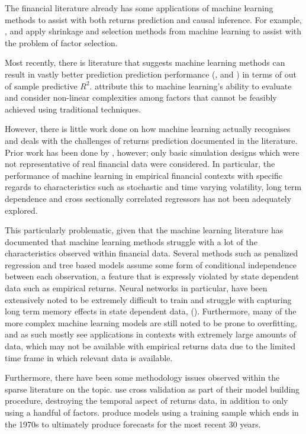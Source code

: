 \documentclass[11pt, a4paper, table]{article}
\begin{document}
The financial literature already has some applications of machine learning methods to assist with both returns prediction and causal inference. For example, \cite{kozak_shrinking_2017}, \cite{rapach_forecasting_2013} and \cite{freyberger_dissecting_2017} apply shrinkage and selection methods from machine learning to assist with the problem of factor selection.

Most recently, there is literature that suggests machine learning methods can result in vastly better prediction prediction performance (\cite{gu_empirical_2018}, \cite{hsu_finding_2014} and \cite{feng_deep_2018}) in terms of out of sample predictive $R^2$. \cite{gu_empirical_2018} attribute this to machine learning's ability to evaluate and consider non-linear complexities among factors that cannot be feasibly achieved using traditional techniques. 

However, there is little work done on how machine learning actually recognises and deals with the challenges of returns prediction documented in the literature. Prior work has been done by \cite{gu_empirical_2018}, however; only basic simulation designs which were not representative of real financial data were considered. In particular, the performance of machine learning in empirical financial contexts with specific regards to characteristics such as stochastic and time varying volatility, long term dependence and cross sectionally correlated regressors has not been adequately explored. 

This particularly problematic, given that the machine learning literature has documented that machine learning methods struggle with a lot of the characteristics observed within financial data. Several methods such as penalized regression and tree based models assume some form of conditional independence between each observation, a feature that is expressly violated by state dependent data such as empirical returns. Neural networks in particular, have been extensively noted to be extremely difficult to train and struggle with capturing long term memory effects in state dependent data, (\cite{bengio_learning_1994}). Furthermore, many of the more complex machine learning models are still noted to be prone to overfitting, and as such mostly see applications in contexts with extremely large amounts of data, which may not be available with empirical returns data due to the limited time frame in which relevant data is available. 

Furthermore, there have been some methodology issues observed within the sparse literature on the topic. \cite{feng_deep_2018} use cross validation as part of their model building procedure, destroying the temporal aspect of returns data, in addition to only using a handful of factors. \cite{gu_empirical_2018} produce models using a training sample which ends in the 1970s to ultimately produce forecasts for the most recent 30 years. 
\end{document}
